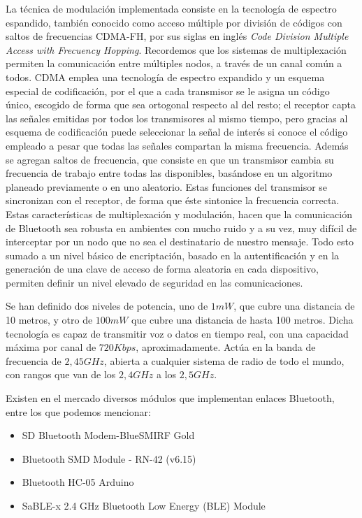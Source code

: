 \documentclass[conference,a4paper,9pt]{IEEEtran}
\begin{document}
La técnica de modulación implementada consiste en la tecnología de espectro espandido, también conocido como acceso múltiple por división de códigos con saltos de frecuencias CDMA-FH, por sus siglas en inglés \textit{Code Division Multiple Access with Frecuency Hopping}. Recordemos que los sistemas de multiplexación permiten la comunicación entre múltiples nodos, a través de un canal común a todos. CDMA emplea una tecnología de espectro expandido y un esquema especial de codificación, por el que a cada transmisor se le asigna un código único, escogido de forma que sea ortogonal respecto al del resto; el receptor capta las señales emitidas por todos los transmisores al mismo tiempo, pero gracias al esquema de codificación puede seleccionar la señal de interés si conoce el código empleado a pesar que todas las señales compartan la misma frecuencia. Además se agregan saltos de frecuencia, que consiste en que un transmisor cambia su frecuencia de trabajo entre todas las disponibles, basándose en un algoritmo planeado previamente o en uno aleatorio. Estas funciones del transmisor se sincronizan con el receptor, de forma que éste sintonice la frecuencia correcta. Estas características de multiplexación y modulación, hacen que la comunicación de Bluetooth sea robusta en ambientes con mucho ruido y a su vez, muy difícil de interceptar por un nodo que no sea el destinatario de nuestro mensaje. Todo esto sumado a un nivel básico de encriptación, basado en la autentificación y en la generación de una clave de acceso de forma
aleatoria en cada dispositivo, permiten definir un nivel elevado de seguridad en las comunicaciones.

Se han definido dos niveles de potencia, uno de $1mW$, que cubre una distancia de 10 metros, y otro de $100mW$ que cubre una distancia de hasta 100 metros. Dicha tecnología es capaz de transmitir voz o datos en tiempo real, con una capacidad máxima por canal de $720Kbps$, aproximadamente. Actúa en la banda de frecuencia de $2,45GHz$, abierta a cualquier sistema de radio de todo el mundo, con rangos que van de los $2,4GHz$ a los $2,5GHz$.

Existen en el mercado diversos módulos que implementan enlaces Bluetooth, entre los que podemos mencionar:

\begin{itemize}
	\item SD Bluetooth Modem-BlueSMIRF Gold
	\item Bluetooth SMD Module - RN-42 (v6.15)
	\item Bluetooth HC-05 Arduino \cite{bluetooth}
	\item SaBLE-x 2.4 GHz Bluetooth Low Energy (BLE) Module
\end{itemize}
\end{document}
